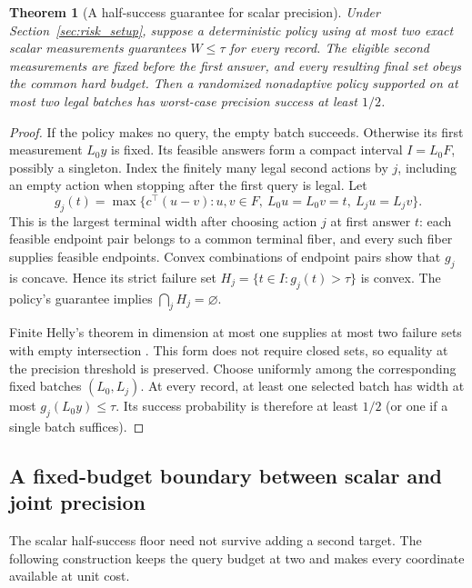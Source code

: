 \documentclass[12pt]{article}
\newtheorem{theorem}{Theorem}
\begin{document}
\begin{theorem}[A half-success guarantee for scalar precision]
\label{thm:helly-precision}
Under Section~\ref{sec:risk_setup}, suppose a deterministic policy using
at most two exact scalar measurements guarantees $W\leq\tau$ for every
record. The eligible second measurements are fixed before the first
answer, and every resulting final set obeys the common hard budget.
Then a randomized nonadaptive policy supported on at most two legal
batches has worst-case precision success at least $1/2$.
\end{theorem}
\begin{proof}
If the policy makes no query, the empty batch succeeds. Otherwise its
first measurement $L_0y$ is fixed. Its feasible answers form a compact
interval $I=L_0F$, possibly a singleton. Index the finitely many legal
second actions by $j$, including an empty action when stopping after the
first query is legal. Let
\[
 g_j(t)=\max\{c^\top(u-v):u,v\in F,\ L_0u=L_0v=t,
                                      \ L_ju=L_jv\}.
\]
This is the largest terminal width after choosing action $j$ at first
answer $t$: each feasible endpoint pair belongs to a common terminal
fiber, and every such fiber supplies feasible endpoints. Convex
combinations of endpoint pairs show that $g_j$ is concave. Hence its
strict failure set $H_j=\{t\in I:g_j(t)>\tau\}$ is convex.
The policy's guarantee implies $\bigcap_j H_j=\varnothing$.

Finite Helly's theorem in dimension at most one supplies at most two
failure sets with empty intersection \citep[Theorem~1.1]{amenta2016}.
This form does not require closed sets, so equality at the precision
threshold is preserved. Choose uniformly among the corresponding
fixed batches $(L_0,L_j)$. At every record, at least one selected batch
has width at most $g_j(L_0y)\leq\tau$. Its success probability is
therefore at least $1/2$ (or one if a single batch suffices).
\end{proof}
\subsection{A fixed-budget boundary between scalar and joint precision}
\label{sec:two-target-boundary}
The scalar half-success floor need not survive adding a second target.
The following construction keeps the query budget at two and makes every
coordinate available at unit cost.
\end{document}
